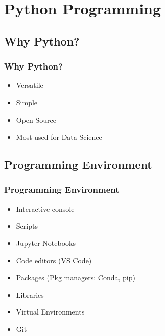 



\begin{frame}
   \titlepage
\end{frame}



\begin{frame}
   \tableofcontents
\end{frame}

\section{Python Programming}


\subsection{Why Python?}
\begin{frame}\frametitle{Why Python?}
   \begin{itemize}
      \item Versatile
      \item Simple
      \item Open Source
      \item Most used for Data Science
   \end{itemize}
\end{frame}


\subsection{Programming Environment}
\begin{frame}\frametitle{Programming Environment}

      \begin{itemize}
         \item<1-> Interactive console
         \item<2-> Scripts
         \item<3-> Jupyter Notebooks
         \item<4-> Code editors (VS Code)
         \item<5-> Packages (Pkg managers: Conda, pip)
         \item<6-> Libraries
         \item<7-> Virtual Environments
         \item<8-> Git
      \end{itemize}

\end{frame}
